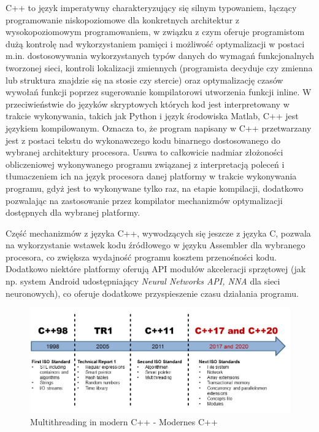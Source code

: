 C++ to język imperatywny charakteryzujący się silnym typowaniem, łączący programowanie niskopoziomowe dla konkretnych architektur z wysokopoziomowym programowaniem, w związku z czym oferuje programistom dużą kontrolę nad wykorzystaniem pamięci i możliwość optymalizacji w postaci m.in. dostosowywania wykorzystanych typów danych do wymagań funkcjonalnych tworzonej sieci, kontroli lokalizacji zmiennych (programista decyduje czy zmienna lub struktura znajdzie się na stosie czy stercie) oraz optymalizację czasów wywołań funkcji poprzez sugerowanie kompilatorowi utworzenia funkcji inline. W przeciwieństwie do języków skryptowych których kod jest interpretowany w trakcie wykonywania, takich jak Python i język środowiska Matlab, C++ jest językiem kompilowanym. Oznacza to, że program napisany w C++ przetwarzany jest z postaci tekstu do wykonawczego kodu binarnego dostosowanego do wybranej architektury procesora. Usuwa to całkowicie nadmiar złożoności obliczeniowej wykonywanego programu związanej z interpretacją poleceń i tłumaczeniem ich na język procesora danej platformy w trakcie wykonywania programu, gdyż jest to wykonywane tylko raz, na etapie kompilacji, dodatkowo pozwalając na zastosowanie przez kompilator mechanizmów optymalizacji dostępnych dla wybranej platformy. 

Część mechanizmów z języka C++, wywodzących się jeszcze z języka C, pozwala na wykorzystanie wstawek kodu źródłowego w języku Assembler dla wybranego procesora, co zwiększa wydajność programu kosztem przenośności kodu. Dodatkowo niektóre platformy oferują API modułów akceleracji sprzętowej (jak np. system Android udostępniający \textit{Neural Networks API, NNA} dla sieci neuronowych), co oferuje dodatkowe przyspieszenie czasu działania programu.

\begin{figure}[!ht]
    \centering
    \includegraphics[width=150mm]{Rysunki/Rozdzial2/multithreading.jpg}
    \caption{Multithreading in modern C++ - Modernes C++}
    \label{fig:my_label}
\end{figure}

